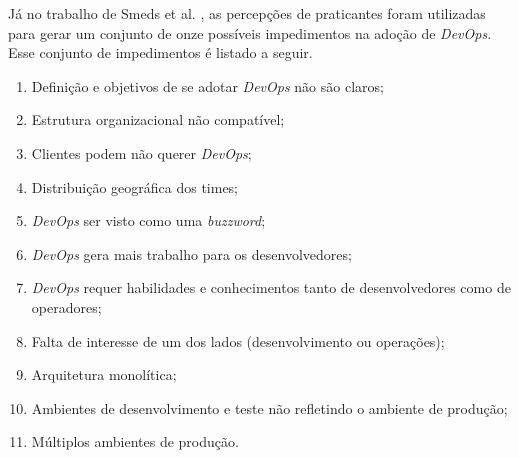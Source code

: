Já no trabalho de Smeds et al. \cite{devops_a_definition}, as percepções de
praticantes foram utilizadas para gerar um conjunto de onze possíveis
impedimentos na adoção de \textit{DevOps}. Esse conjunto de impedimentos é
listado a seguir.

\begin{enumerate}
\item Definição e objetivos de se adotar \textit{DevOps} não são claros;
\item Estrutura organizacional não compatível;
\item Clientes podem não querer \textit{DevOps};
\item Distribuição geográfica dos times;
\item \textit{DevOps} ser visto como uma \textit{buzzword};
\item \textit{DevOps} gera mais trabalho para os desenvolvedores;
\item \textit{DevOps} requer habilidades e conhecimentos tanto de desenvolvedores
como de operadores;
\item Falta de interesse de um dos lados (desenvolvimento ou operações);
\item Arquitetura monolítica;
\item Ambientes de desenvolvimento e teste não refletindo o ambiente de produção;
\item Múltiplos ambientes de produção.
\end{enumerate}
